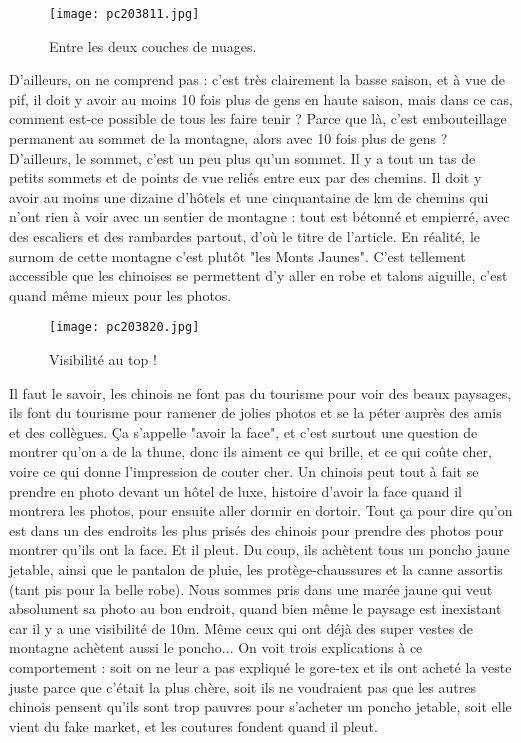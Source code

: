 \documentclass{book}
\begin{document}
\begin{figure}[h]
\centering
\texttt{[image: pc203811.jpg]}
\caption*{Entre les deux couches de nuages.}
\end{figure}

D'ailleurs, on ne comprend pas : c'est très clairement la basse saison, et à vue de pif, il doit y avoir au moins 10 fois plus de gens en haute saison, mais dans ce cas, comment est-ce possible de tous les faire tenir ? Parce que là, c'est embouteillage permanent au sommet de la montagne, alors avec 10 fois plus de gens ? D'ailleurs, le sommet, c'est un peu plus qu'un sommet. Il y a tout un tas de petits sommets et de points de vue reliés entre eux par des chemins. Il doit y avoir au moins une dizaine d'hôtels et une cinquantaine de km de chemins qui n'ont rien à voir avec un sentier de montagne : tout est bétonné et empierré, avec des escaliers et des rambardes partout, d'où le titre de l'article. En réalité, le surnom de cette montagne c'est plutôt "les Monts Jaunes". C'est tellement accessible que les chinoises  se permettent d'y aller en robe et talons aiguille, c'est quand même mieux pour les photos.


\begin{figure}[h]
\centering
\texttt{[image: pc203820.jpg]}
\caption*{Visibilité au top !}
\end{figure}

Il faut le savoir, les chinois ne font pas du tourisme pour voir des beaux paysages, ils font du tourisme pour ramener de jolies photos et se la péter auprès des amis et des collègues. Ça s'appelle "avoir la face", et c'est surtout une question de montrer qu'on a de la thune, donc ils aiment ce qui brille, et ce qui coûte cher, voire ce qui donne l'impression de couter cher. Un chinois peut tout à fait se prendre en photo devant un hôtel de luxe, histoire d'avoir la face quand il montrera les photos, pour ensuite aller dormir en dortoir. Tout ça pour dire qu'on est dans un des endroits les plus prisés des chinois pour prendre des photos pour montrer qu'ils ont la face. Et il pleut. Du coup, ils achètent tous un poncho jaune jetable, ainsi que le pantalon de pluie, les protège-chaussures et la canne assortis (tant pis pour la belle robe). Nous sommes pris dans une marée jaune qui veut absolument sa photo au bon endroit, quand bien même le paysage est inexistant car il y a une visibilité de 10m. Même ceux qui ont déjà des super vestes de montagne achètent aussi le poncho... On voit trois explications à ce comportement : soit on ne leur a pas expliqué le gore-tex et ils ont acheté la veste juste parce que c'était la plus chère, soit ils ne voudraient pas que les autres chinois pensent qu'ils sont trop pauvres pour s'acheter un poncho jetable, soit elle vient du fake market, et les coutures fondent quand il pleut.
\end{document}
